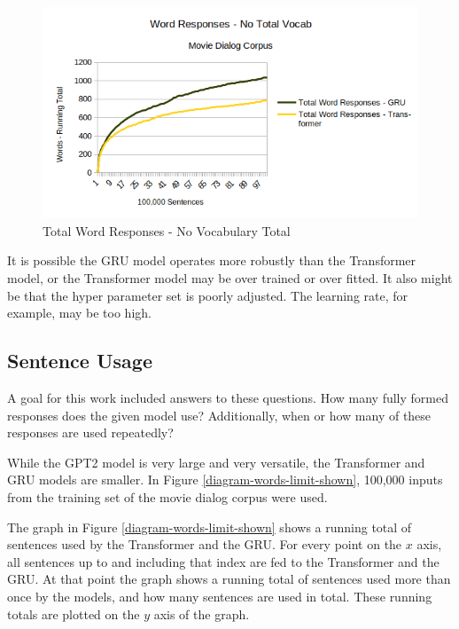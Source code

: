 \begin{figure}[H]
	\begin{center}
		\includegraphics[scale=0.75]{diagram-100000-novocab}
		
		
	\end{center}
	\caption[Total Word Responses]{Total Word Responses - No Vocabulary Total}
	\label{diagram-words-no-voc-total}
	
\end{figure}

It is possible the GRU model operates more robustly than the Transformer model, or the Transformer model may be over trained or over fitted. It also might be that the hyper parameter set is poorly adjusted. The learning rate, for example, may be too high.

\subsection{Sentence Usage}
A goal for this work included answers to these questions.
How many fully formed responses does the given model use? Additionally, when or how many of these responses are used repeatedly?

While the GPT2 model is very large and very versatile, the Transformer and GRU models are smaller. In Figure \ref{diagram-words-limit-shown}, 100,000 inputs from the training set of the movie dialog corpus were used. 

The graph in Figure \ref{diagram-words-limit-shown} shows a running total of sentences used by the Transformer and the GRU. For every point on the $x$ axis, all sentences up to and including that index are fed to the Transformer and the GRU. At that point the graph shows a running total of sentences used more than once by the models, and how many sentences are used in total. These running totals are plotted on the $y$ axis of the graph.

